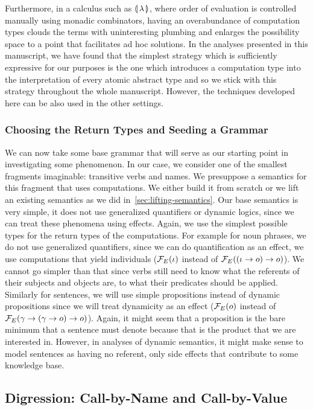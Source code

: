 Furthermore, in a calculus such as $\llparenthesis \, \lambda \, \rrparenthesis$, where order of
evaluation is controlled manually using monadic combinators, having an
overabundance of computation types clouds the terms with uninteresting
plumbing and enlarges the possibility space to a point that facilitates ad
hoc solutions. In the analyses presented in this manuscript, we have found
that the simplest strategy which is sufficiently expressive for our
purposes is the one which introduces a computation type into the
interpretation of every atomic abstract type and so we stick with this
strategy throughout the whole manuscript. However, the techniques developed
here can be also used in the other settings.


\subsubsection{Choosing the Return Types and Seeding a Grammar}

We can now take some base grammar that will serve as our starting point in
investigating some phenomenon. In our case, we consider one of the smallest
fragments imaginable: transitive verbs and names. We presuppose a semantics
for this fragment that uses computations. We either build it from scratch
or we lift an existing semantics as we did
in~\ref{sec:lifting-semantics}. Our base semantics is very simple, it does
not use generalized quantifiers or dynamic logics, since we can treat these
phenomena using effects. Again, we use the simplest possible types for the
return types of the computations. For example for noun phrases, we do not
use generalized quantifiers, since we can do quantification as an effect,
we use computations that yield individuals ($\mathcal{F}_E(\iota)$ instead of
$\mathcal{F}_E((\iota \to o) \to o)$). We cannot go simpler than that since verbs
still need to know what the referents of their subjects and objects are, to
what their predicates should be applied. Similarly for sentences, we will
use simple propositions instead of dynamic propositions since we will treat
dynamicity as an effect ($\mathcal{F}_E(o)$ instead of
$\mathcal{F}_E(\gamma \to (\gamma \to o) \to o)$). Again, it might seem that a
proposition is the bare minimum that a sentence must denote because that is
the product that we are interested in. However, in analyses of dynamic
semantics, it might make sense to model sentences as having no referent,
only side effects that contribute to some knowledge base.


\subsection{Digression: Call-by-Name and Call-by-Value}
\label{ssec:cbn-and-cbv}

